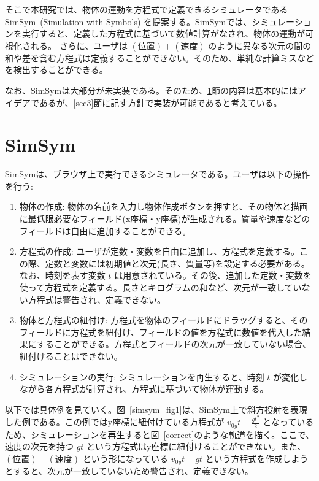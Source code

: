 \documentclass[11pt, a4paper, oneside, twocolumn, dvipdfmx]{jsarticle}
\newcommand{\simname}{SimSym}
\newcommand{\simnamealt}{Simulation with Symbols}
\begin{document}
そこで本研究では、物体の運動を方程式で定義できるシミュレータである \simname~(\simnamealt) を提案する。\simname では、シミュレーションを実行すると、定義した方程式に基づいて数値計算がなされ、物体の運動が可視化される。
さらに、ユーザは $(\text{位置}) + (\text{速度})$ のように異なる次元の間の和や差を含む方程式は定義することができない。そのため、単純な計算ミスなどを検出することができる。

なお、\simname は大部分が未実装である。そのため、\ref{sec2}節の内容は基本的にはアイデアであるが、\ref{sec3}節に記す方針で実装が可能であると考えている。

\section{\simname} \label{sec2}

\simname は、ブラウザ上で実行できるシミュレータである。ユーザは以下の操作を行う:

\begin{enumerate}
\item 物体の作成: 物体の名前を入力し物体作成ボタンを押すと、その物体と描画に最低限必要なフィールド(x座標・y座標)が生成される。質量や速度などのフィールドは自由に追加することができる。
\item 方程式の作成: ユーザが定数・変数を自由に追加し、方程式を定義する。この際、定数と変数には初期値と次元(長さ、質量等)を設定する必要がある。なお、時刻を表す変数 $t$ は用意されている。その後、追加した定数・変数を使って方程式を定義する。長さとキログラムの和など、次元が一致していない方程式は警告され、定義できない。
\item 物体と方程式の紐付け: 方程式を物体のフィールドにドラッグすると、そのフィールドに方程式を紐付け、フィールドの値を方程式に数値を代入した結果にすることができる。方程式とフィールドの次元が一致していない場合、紐付けることはできない。
\item シミュレーションの実行: シミュレーションを再生すると、時刻 $t$ が変化しながら各方程式が計算され、方程式に基づいて物体が運動する。
\end{enumerate}

以下では具体例を見ていく。図~\ref{simsym_fig1}は、\simname 上で斜方投射を表現した例である。この例ではy座標に紐付けている方程式が $v_{0y}t - \frac{gt^2}{2}$ となっているため、シミュレーションを再生すると図~\ref{correct}のような軌道を描く。ここで、速度の次元を持つ $gt$ という方程式はy座標に紐付けることができない。また、$(\text{位置}) - (\text{速度})$ という形になっている $v_{0y}t - gt$ という方程式を作成しようとすると、次元が一致していないため警告され、定義できない。
\end{document}
